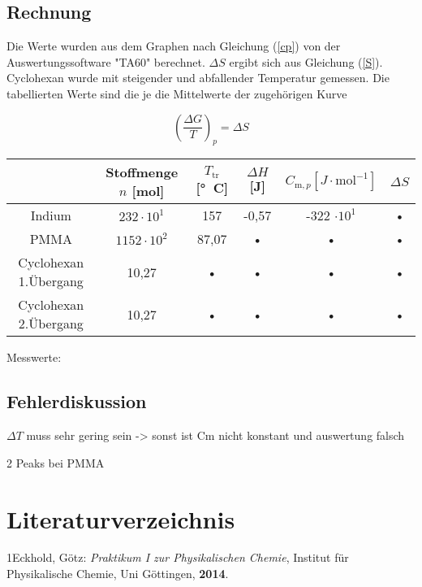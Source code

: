 \documentclass[a4paper,12pt,oneside,onecolum,final,openany]{report}
\begin{document}
\section{Rechnung}

Die Werte wurden aus dem Graphen nach Gleichung (\ref{cp}) von der Auswertungssoftware "TA60" berechnet. 
$\Delta S$ ergibt sich aus Gleichung (\ref{S}). Cyclohexan wurde mit steigender und abfallender Temperatur gemessen. Die tabellierten Werte sind die je die Mittelwerte der zugehörigen Kurve 

\begin{equation}\label{S}
\left(\frac{\Delta G}{T}\right)_p = \Delta S
\end{equation}
\begin{tabular}{|c|c|c|c|c|c|}
\hline 
 & Stoffmenge $n$ [mol] & $T_\mathrm{tr}$ [°~C] & $\Delta H$ [J] & $C_{\mathrm{m},p} [J \cdot \mathrm{mol}^{-1}]$ & $\Delta S$ \\ 
\hline 
Indium & $232 \cdot 10^1$ & 157 & -0,57 & -322 $\cdot 10^1$ & • \\ 
\hline 
PMMA & $1152 \cdot 10^2$ & 87,07 & • & • & • \\ 
\hline 
Cyclohexan 1.Übergang & 10,27 & • & • & • & • \\ 
Cyclohexan 2.Übergang & 10,27 & • & • & • & • \\
\hline 
\end{tabular} 



Messwerte:\\










\section{Fehlerdiskussion}
$\Delta T$ muss sehr gering sein -> sonst ist Cm nicht konstant und auswertung falsch

2 Peaks bei PMMA

\chapter{Literaturverzeichnis}
1\quad Eckhold, Götz: \emph{Praktikum I zur Physikalischen Chemie}, Institut für Physikalische Chemie, Uni Göttingen, \textbf{2014}.

\vspace{0,5 cm}
\end{document}
